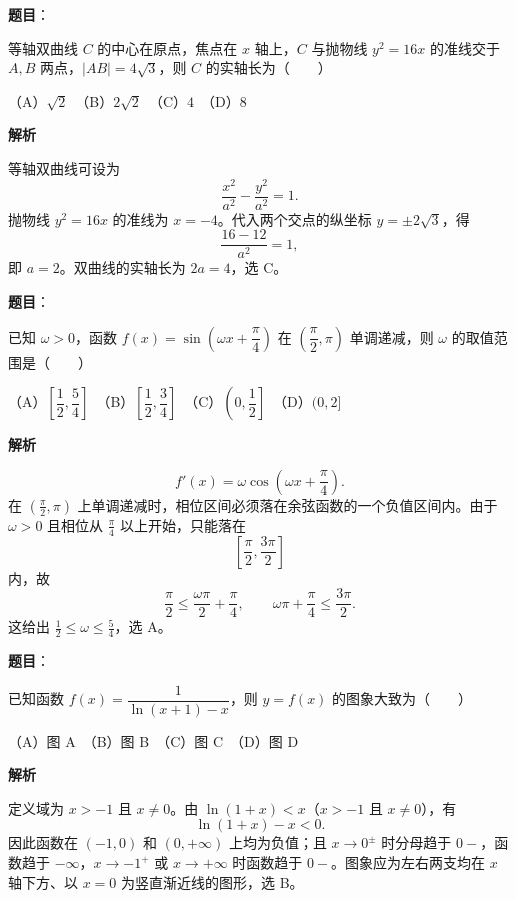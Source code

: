 \begin{answer}

\textbf{题目}：

等轴双曲线 $C$ 的中心在原点，焦点在 $x$ 轴上，$C$ 与抛物线 $y^2=16x$ 的准线交于 $A,B$ 两点，$|AB|=4\sqrt3$，则 $C$ 的实轴长为\mbox{（　　）}

（A）$\sqrt2$　（B）$2\sqrt2$　（C）$4$　（D）$8$

\textbf{解析}

等轴双曲线可设为
\nopagebreak[4]
\[
\frac{x^2}{a^2}-\frac{y^2}{a^2}=1.
\]
抛物线 $y^2=16x$ 的准线为 $x=-4$。代入两个交点的纵坐标 $y=\pm2\sqrt3$，得
\nopagebreak[4]
\[
\frac{16-12}{a^2}=1,
\]
即 $a=2$。双曲线的实轴长为 $2a=4$，选 C。


\end{answer}
\begin{answer}

\textbf{题目}：

已知 $\omega>0$，函数 $f(x)=\sin\left(\omega x+\dfrac{\pi}{4}\right)$ 在 $\left(\dfrac{\pi}{2},\pi\right)$ 单调递减，则 $\omega$ 的取值范围是\mbox{（　　）}

（A）$\left[\dfrac12,\dfrac54\right]$　（B）$\left[\dfrac12,\dfrac34\right]$　（C）$\left(0,\dfrac12\right]$　（D）$(0,2]$

\textbf{解析}

\nopagebreak[4]
\[
f'(x)=\omega\cos\left(\omega x+\frac{\pi}{4}\right).
\]
在 $\left(\frac\pi2,\pi\right)$ 上单调递减时，相位区间必须落在余弦函数的一个负值区间内。由于 $\omega>0$ 且相位从 $\frac\pi4$ 以上开始，只能落在
\nopagebreak[4]
\[
\left[\frac\pi2,\frac{3\pi}2\right]
\]
内，故
\nopagebreak[4]
\[
\frac{\pi}{2}\leqslant\frac{\omega\pi}{2}+\frac\pi4,\qquad
\omega\pi+\frac\pi4\leqslant\frac{3\pi}{2}.
\]
这给出 $\frac12\leqslant\omega\leqslant\frac54$，选 A。


\end{answer}
\begin{answer}

\textbf{题目}：

已知函数 $f(x)=\dfrac{1}{\ln(x+1)-x}$，则 $y=f(x)$ 的图象大致为\mbox{（　　）}
\nopagebreak[4]
\begin{center}\end{center}
\nopagebreak[4]
（A）图 A　（B）图 B　（C）图 C　（D）图 D

\textbf{解析}

定义域为 $x>-1$ 且 $x\ne0$。由 $\ln(1+x)<x$（$x>-1$ 且 $x\ne0$），有
\nopagebreak[4]
\[
\ln(1+x)-x<0.
\]
因此函数在 $(-1,0)$ 和 $(0,+\infty)$ 上均为负值；且 $x\to0^\pm$ 时分母趋于 $0-$，函数趋于 $-\infty$，$x\to-1^+$ 或 $x\to+\infty$ 时函数趋于 $0-$。图象应为左右两支均在 $x$ 轴下方、以 $x=0$ 为竖直渐近线的图形，选 B。


\end{answer}
